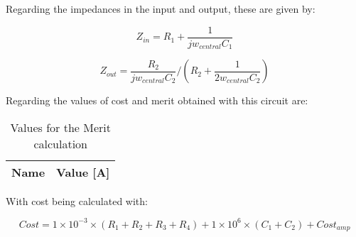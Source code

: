 Regarding the impedances in the input and output, these are given by:


\begin{equation}
    Z_{in}= R_1+\frac{1}{jw_{central} C_1}
\end{equation}


\begin{equation}
   Z_{out}= \frac{R_2}{jw_{central}C_2}/\left ( R_2+\frac{1}{2w_{central}C_2} \right )
\end{equation}


Regarding the values of cost and merit obtained with this circuit are:

\begin{table}[h]
  \centering
  \begin{tabular}{|l|r|}
    \hline    
    {\bf Name} & {\bf Value [A]} \\ \hline
    
  \end{tabular}
  \caption{Values for the Merit calculation}
  \label{tab:merito}
\end{table}

With cost being calculated with:

\begin{equation}
    Cost = 1\times 10^{-3}\times \left ( R_1+R_2+R_3+R_4 \right )+1\times 10^{6}\times\left ( C_1+C_2 \right ) + Cost_{amp}
\end{equation}


